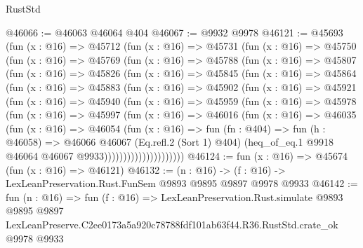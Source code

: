 \begin{lexlean}{RustStd}
\begin{coremodule}
@46066 := @46063 @46064 @404
@46067 := @9932 @9978
@46121 := @45693
    (fun (x : @16) =>
    @45712
      (fun (x : @16) =>
      @45731
        (fun (x : @16) =>
        @45750
          (fun (x : @16) =>
          @45769
            (fun (x : @16) =>
            @45788
              (fun (x : @16) =>
              @45807
                (fun (x : @16) =>
                @45826
                  (fun (x : @16) =>
                  @45845
                    (fun (x : @16) =>
                    @45864
                      (fun (x : @16) =>
                      @45883
                        (fun (x : @16) =>
                        @45902
                          (fun (x : @16) =>
                          @45921
                            (fun (x : @16) =>
                            @45940
                              (fun (x : @16) =>
                              @45959
                                (fun (x : @16) =>
                                @45978
                                  (fun (x : @16) =>
                                  @45997
                                    (fun (x : @16) =>
                                    @46016
                                      (fun (x : @16) =>
                                      @46035
                                        (fun (x : @16) =>
                                        @46054
                                          (fun (x : @16) =>
                                          fun (fn : @404) =>
                                          fun (h : @46058) =>
                                          @46066
                                            @46067
                                            (Eq.refl.{2} (Sort 1) @404)
                                            (heq_of_eq.{1}
                                              @9918
                                              @46064
                                              @46067
                                              @9933)))))))))))))))))))))
@46124 := fun (x : @16) => @45674 (fun (x : @16) => @46121)
@46132 := (n : @16) -> (f : @16) -> LexLeanPreservation.Rust.FunSem @9893 @9895 @9897 @9978 @9933
@46142 := fun (n : @16) =>
  fun (f : @16) =>
  LexLeanPreservation.Rust.simulate
    @9893
    @9895
    @9897
    LexLeanPreserve.C2ee0173a5a920c78788fdf101ab63f44.R36.RustStd.crate_ok
    @9978
    @9933
\end{coremodule}
\end{lexlean}
